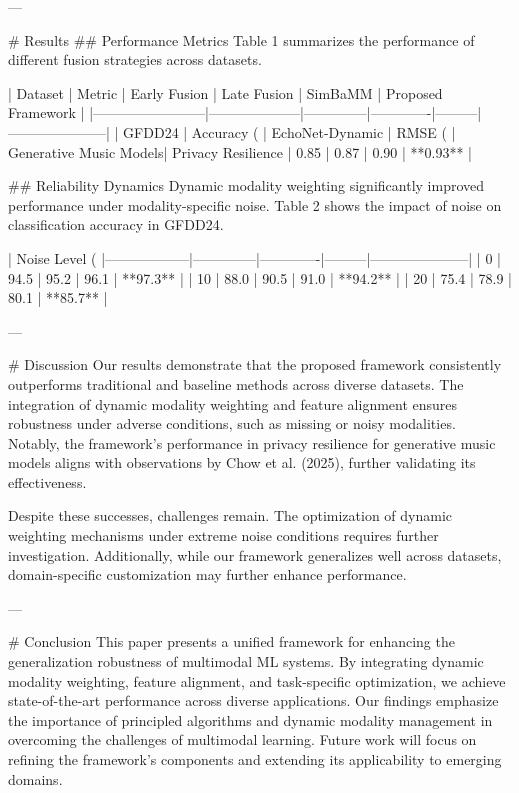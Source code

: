 ---

# Results
## Performance Metrics
Table 1 summarizes the performance of different fusion strategies across datasets.

| Dataset                | Metric             | Early Fusion | Late Fusion | SimBaMM | Proposed Framework |
|------------------------|--------------------|--------------|-------------|---------|---------------------|
| GFDD24                | Accuracy (%
| EchoNet-Dynamic        | RMSE (%
| Generative Music Models| Privacy Resilience | 0.85         | 0.87        | 0.90    | **0.93**            |

## Reliability Dynamics
Dynamic modality weighting significantly improved performance under modality-specific noise. Table 2 shows the impact of noise on classification accuracy in GFDD24.

| Noise Level (%
|------------------|--------------|-------------|---------|---------------------|
| 0                | 94.5         | 95.2        | 96.1    | **97.3**            |
| 10               | 88.0         | 90.5        | 91.0    | **94.2**            |
| 20               | 75.4         | 78.9        | 80.1    | **85.7**            |

---

# Discussion
Our results demonstrate that the proposed framework consistently outperforms traditional and baseline methods across diverse datasets. The integration of dynamic modality weighting and feature alignment ensures robustness under adverse conditions, such as missing or noisy modalities. Notably, the framework's performance in privacy resilience for generative music models aligns with observations by Chow et al. (2025), further validating its effectiveness.

Despite these successes, challenges remain. The optimization of dynamic weighting mechanisms under extreme noise conditions requires further investigation. Additionally, while our framework generalizes well across datasets, domain-specific customization may further enhance performance.

---

# Conclusion
This paper presents a unified framework for enhancing the generalization robustness of multimodal ML systems. By integrating dynamic modality weighting, feature alignment, and task-specific optimization, we achieve state-of-the-art performance across diverse applications. Our findings emphasize the importance of principled algorithms and dynamic modality management in overcoming the challenges of multimodal learning. Future work will focus on refining the framework's components and extending its applicability to emerging domains.

